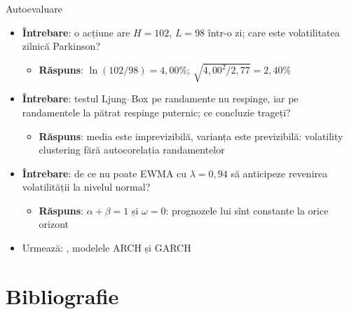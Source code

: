 \begin{frame}{Autoevaluare}
\itemsize{\small}
\begin{itemize}
    \item \textbf{Întrebare}: o acțiune are $H = 102$, $L = 98$ într-o zi; care este volatilitatea zilnică Parkinson?
    \begin{itemize}
        \item \textbf{Răspuns}: $\ln(102/98) = 4{,}00\%$; $\sqrt{4{,}00^2/2{,}77} = 2{,}40\%$
    \end{itemize}
    \item \textbf{Întrebare}: testul Ljung--Box pe randamente nu respinge, iar pe randamentele la pătrat respinge puternic; ce concluzie trageți?
    \begin{itemize}
        \item \textbf{Răspuns}: media este imprevizibilă, varianța este previzibilă: volatility clustering fără autocorelația randamentelor
    \end{itemize}
    \item \textbf{Întrebare}: de ce nu poate EWMA cu $\lambda = 0{,}94$ să anticipeze revenirea volatilității la nivelul normal?
    \begin{itemize}
        \item \textbf{Răspuns}: $\alpha + \beta = 1$ și $\omega = 0$: prognozele lui sînt constante la orice orizont
    \end{itemize}
    \item Urmează: , modelele ARCH și GARCH
\end{itemize}
\end{frame}


\section{Bibliografie}

